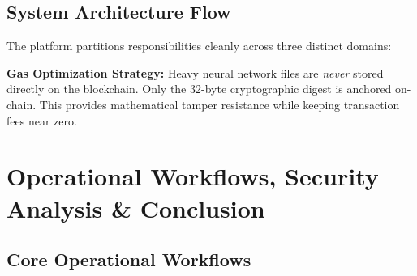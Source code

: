 \documentclass[11pt,a4paper]{article}
\begin{document}
\subsection{System Architecture Flow}
The platform partitions responsibilities cleanly across three distinct domains:

\begin{center}
\end{center}

\textbf{Gas Optimization Strategy:} Heavy neural network files are \emph{never} stored directly on the blockchain. Only the 32-byte cryptographic digest is anchored on-chain. This provides mathematical tamper resistance while keeping transaction fees near zero.

\clearpage

\section{Operational Workflows, Security Analysis \& Conclusion}

\subsection{Core Operational Workflows}
\end{document}
